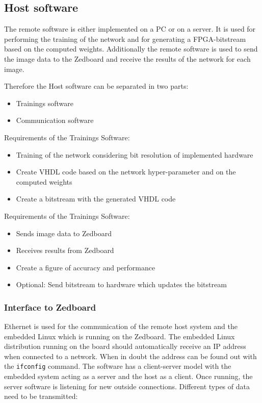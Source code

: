 \subsection{Host software}

The remote software is either implemented on a PC or on a server. It is used for performing the training of the network and for generating a FPGA-bitstream based on the computed weights. Additionally the remote software is used to send the image data to the Zedboard and receive the results of the network for each image. 

Therefore the Host software can be separated in two parts:
\begin{itemize}
	\item Trainings software
	\item Communication software
\end{itemize} 

Requirements of the Trainings Software:
\begin{itemize} 
	\item Training of the network considering bit resolution of implemented hardware
	\item Create VHDL code based on the network hyper-parameter and on the computed weights
	\item Create a bitstream with the generated VHDL code
\end{itemize}

Requirements of the Trainings Software:
\begin{itemize}
	\item Sends image data to Zedboard
	\item Receives results from Zedboard
	\item Create a figure of accuracy and performance   
	\item Optional: Send bitstream to hardware which updates the bitstream 
\end{itemize}

\subsubsection{Interface to Zedboard} \label{subsec:InterfaceRemoteZed}
Ethernet is used for the communication of the remote host system and the embedded Linux which is running on the Zedboard. 
The embedded Linux distribution running on the board should automatically receive an IP address when connected to a network. When in doubt the address can be found out with the \texttt{ifconfig} command. 
The software has a client-server model with the embedded system acting as a server and the host as a client. Once running, the server software is listening for new outside connections. Different types of data need to be transmitted:

